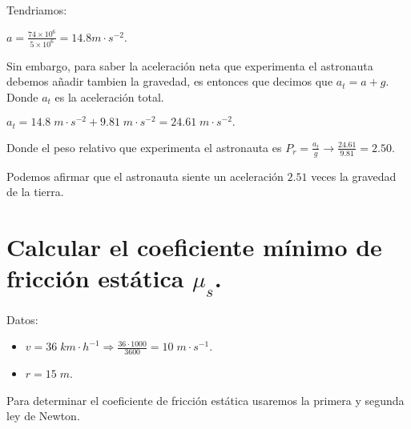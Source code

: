 \documentclass[a4paper,12pt]{article}
\begin{document}
\begin{justify}
    Tendriamos:
\end{justify}

\(a = \frac{74 \times 10^6}{5 \times 10^6} = 14.8 m \cdot s^{-2}\).

\begin{justify}
    Sin embargo, para saber la aceleración neta que experimenta el astronauta debemos añadir tambien la gravedad, es entonces que decimos que \(a_t = a + g.\)
    Donde \(a_t\) es la aceleración total.
\end{justify}

\vspace{\baselineskip}
\(a_t = 14.8 \; m \cdot s^{-2} + 9.81 \; m \cdot s^{-2} = 24.61 \; m \cdot s^{-2} .\)

\begin{justify}
    Donde el peso relativo que experimenta el astronauta es \(P_r = \frac{a_t}{g} \rightarrow \frac{24.61}{9.81}=2.50\).
\end{justify}

\begin{justify}
Podemos afirmar que el astronauta siente un aceleración \(2.51\) veces la gravedad de la tierra.
\end{justify}

\vspace{\baselineskip}
\section{Calcular el coeficiente mínimo de fricción estática \(\mu_s\). }
\vspace{\baselineskip}

\begin{justify}
    Datos:
\end{justify}

\begin{itemize}
    \item \(v = 36 \; km \cdot h^{-1} \Rightarrow \frac{36 \cdot 1000}{3600} = 10 \; m \cdot s^{-1}.\)
    \item \(r = 15 \; m\).
\end{itemize}

\vspace{\baselineskip}

\begin{justify}
    Para determinar el coeficiente de fricción estática usaremos la primera y segunda ley de Newton.
\end{justify}
\end{document}
